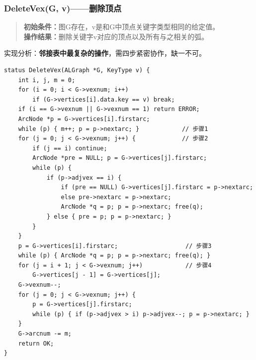 \documentclass[supercite]{Experimental_Report}
\begin{document}
{\subsubsection{DeleteVex(G, v)——删除顶点}

\begin{quote}\small
\textbf{初始条件：}图G存在，v是和G中顶点关键字类型相同的给定值。\\
\textbf{操作结果：}删除关键字v对应的顶点以及所有与之相关的弧。
\end{quote}

实现分析：\textbf{邻接表中最复杂的操作}，需四步紧密协作，缺一不可。


\begin{lstlisting}[label={lst:delete-vex}, caption={DeleteVex——最复杂的邻接表操作}]
status DeleteVex(ALGraph *G, KeyType v) {
    int i, j, m = 0;
    for (i = 0; i < G->vexnum; i++)
        if (G->vertices[i].data.key == v) break;
    if (i == G->vexnum || G->vexnum == 1) return ERROR;
    ArcNode *p = G->vertices[i].firstarc;
    while (p) { m++; p = p->nextarc; }            // 步骤1
    for (j = 0; j < G->vexnum; j++) {             // 步骤2
        if (j == i) continue;
        ArcNode *pre = NULL; p = G->vertices[j].firstarc;
        while (p) {
            if (p->adjvex == i) {
                if (pre == NULL) G->vertices[j].firstarc = p->nextarc;
                else pre->nextarc = p->nextarc;
                ArcNode *q = p; p = p->nextarc; free(q);
            } else { pre = p; p = p->nextarc; }
        }
    }
    p = G->vertices[i].firstarc;                   // 步骤3
    while (p) { ArcNode *q = p; p = p->nextarc; free(q); }
    for (j = i + 1; j < G->vexnum; j++)            // 步骤4
        G->vertices[j - 1] = G->vertices[j];
    G->vexnum--;
    for (j = 0; j < G->vexnum; j++) {
        p = G->vertices[j].firstarc;
        while (p) { if (p->adjvex > i) p->adjvex--; p = p->nextarc; }
    }
    G->arcnum -= m;
    return OK;
}
\end{lstlisting}

\begin{figure}[H]
\centering\footnotesize
{}
\end{figure}}
\end{document}
